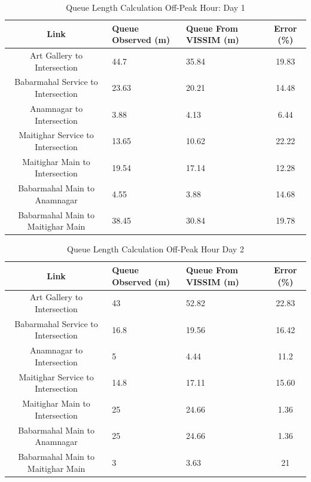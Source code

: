 \begin{table}[h!]
\centering
\caption{Queue Length Calculation Off-Peak Hour: Day 1}
\begin{tabular}{|c|p{2cm}|p{2cm}|c|}
\hline
Link & Queue Observed (m) & Queue From VISSIM (m) & Error (\%) \\
\hline
Art Gallery to Intersection & 44.7 & 35.84 & 19.83 \\ \hline
Babarmahal Service to Intersection & 23.63 & 20.21 & 14.48 \\ \hline
Anamnagar to Intersection & 3.88 & 4.13 & 6.44 \\ \hline
Maitighar Service to Intersection & 13.65 & 10.62 & 22.22 \\ \hline
Maitighar Main to Intersection & 19.54 & 17.14 & 12.28 \\ \hline
Babarmahal Main to Anamnagar & 4.55 & 3.88 & 14.68 \\ \hline
Babarmahal Main to Maitighar Main & 38.45 & 30.84 & 19.78 \\ \hline
\end{tabular}
\end{table}

\begin{table}[h!]
\centering
\caption{Queue Length Calculation Off-Peak Hour Day 2}
\begin{tabular}{|c|p{2cm}|p{2cm}|c|}
\hline
Link & Queue Observed (m) & Queue From VISSIM (m) & Error (\%) \\
\hline
Art Gallery to Intersection & 43 & 52.82 & 22.83 \\ \hline
Babarmahal Service to Intersection & 16.8 & 19.56 & 16.42 \\ \hline
Anamnagar to Intersection & 5 & 4.44 & 11.2 \\ \hline
Maitighar Service to Intersection & 14.8 & 17.11 & 15.60 \\ \hline
Maitighar Main to Intersection & 25 & 24.66 & 1.36 \\ \hline
Babarmahal Main to Anamnagar & 25 & 24.66 & 1.36 \\ \hline
Babarmahal Main to Maitighar Main & 3 & 3.63 & 21 \\ \hline
\end{tabular}
\end{table}

